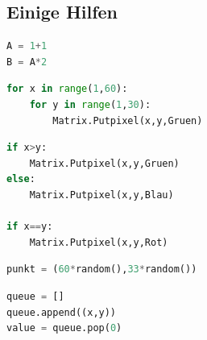 \subsection{\large{Einige Hilfen}}
\begin{lstlisting}[language=Python, caption=Mathematik]
A = 1+1
B = A*2
\end{lstlisting}
\begin{lstlisting}[language=Python, caption=Eine verschachtelte Schleife]
for x in range(1,60):
	for y in range(1,30):
		Matrix.Putpixel(x,y,Gruen)
\end{lstlisting}
\begin{lstlisting}[language=Python, caption=Eine bedingte Abarbeitung]
if x>y:
	Matrix.Putpixel(x,y,Gruen)
else:
	Matrix.Putpixel(x,y,Blau)
	
if x==y:
	Matrix.Putpixel(x,y,Rot)
\end{lstlisting}
\begin{lstlisting}[language=Python, caption=Ein Zufallspunkt]
punkt = (60*random(),33*random())
\end{lstlisting}
\begin{lstlisting}[language=Python, caption=Eine Warteschlange]
queue = []
queue.append((x,y))
value = queue.pop(0)
\end{lstlisting}
